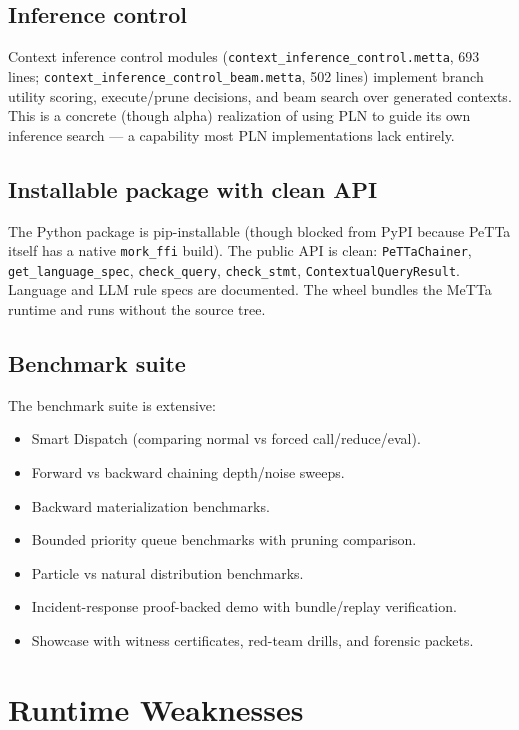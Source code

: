 \documentclass[11pt]{article}
\begin{document}
\subsection{Inference control}

Context inference control modules
(\texttt{context\_inference\_control.metta}, 693 lines;
\texttt{context\_inference\_control\_beam.metta}, 502 lines) implement branch
utility scoring, execute/prune decisions, and beam search over generated contexts.
This is a concrete (though alpha) realization of using PLN to guide its own
inference search --- a capability most PLN implementations lack entirely.

\subsection{Installable package with clean API}

The Python package is pip-installable (though blocked from PyPI because PeTTa
itself has a native \texttt{mork\_ffi} build). The public API is clean:
\texttt{PeTTaChainer}, \texttt{get\_language\_spec}, \texttt{check\_query},
\texttt{check\_stmt}, \texttt{ContextualQueryResult}. Language and LLM rule specs
are documented. The wheel bundles the MeTTa runtime and runs without the source
tree.

\subsection{Benchmark suite}

The benchmark suite is extensive:
\begin{itemize}[nosep]
  \item Smart Dispatch (comparing normal vs forced call/reduce/eval).
  \item Forward vs backward chaining depth/noise sweeps.
  \item Backward materialization benchmarks.
  \item Bounded priority queue benchmarks with pruning comparison.
  \item Particle vs natural distribution benchmarks.
  \item Incident-response proof-backed demo with bundle/replay verification.
  \item Showcase with witness certificates, red-team drills, and forensic packets.
\end{itemize}


\section{Runtime Weaknesses}
\end{document}
